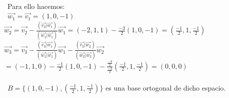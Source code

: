 \documentclass[preview]{standalone}
\begin{document}
\begin{center}
 \\\  Para ello hacemos: \\\  $\vec{w_1} = \vec{v_1} = (1, 0, -1)$  \newline $\vec{w_2} = \vec{v_2} - \frac{(\vec{v_2} | \vec{w_1})}{(\vec{w_1} | \vec{w_1})} \vec{w_1} = (-2, 1, 1) - \frac{-3}{2} (1, 0, -1) = (\frac{-1}{2}, 1, \frac{-1}{2} ) $ \newline $\vec{w_3} = \vec{v_3} - \frac{(\vec{v_3} | \vec{w_1})}{(\vec{w_1} | \vec{w_1})} \vec{w_1} - \frac{(\vec{v_3} | \vec{w_2})}{(\vec{w_2} | \vec{w_2})} \vec{w_2} $\newline $ = (-1, 1, 0) - \frac{-1}{2} (1, 0, -1) - \frac{\frac{-3}{2}}{\frac{-3}{2}} (\frac{-1}{2}, 1, \frac{-1}{2}) = (0, 0, 0) $ \\\ \\\ $B = \{ (1, 0, -1), (\frac{-1}{2}, 1, \frac{-1}{2}) \} $ es una base ortogonal de dicho espacio.
\end{center}
\end{document}
